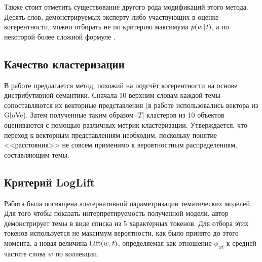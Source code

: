 Также стоит отметить существование другого рода модификаций этого метода. Десять слов, демонстрируемых эксперту либо участвующих в оценке когерентности, можно отбирать не по критерию максимума $p(w\mspace{2mu}{|}\mspace{2mu} t)$, а по некоторой более сложной формуле \cite{Blei_lafferty,ldavis2014,boydcare,frex}.





\subsection{Качество кластеризации}

В работе \cite{krasnov19clustering} предлагается метод, похожий на подсчёт когерентности на основе дистрибутивной семантики. Сначала 10 верхним словам каждой темы сопоставляются их векторные представления (в работе использовались вектора из GloVe). Затем полученные таким образом $|T|$ кластеров из 10 объектов оцениваются с помощью различных метрик кластеризации. Утверждается, что переход к векторным представлениям необходим, поскольку понятие <<расстояния>> не совсем применимо к вероятностным распределениям, составляющим темы.


\subsection{Критерий LogLift}
Работа \cite{taddy2012estimation} была посвящена альтернативной параметризации тематических моделей. Для того чтобы показать интерпретируемость полученной модели, автор демонстрирует темы в виде списка из 5 характерных токенов. Для отбора этих токенов используется не максимум вероятности, как было принято до этого момента, а новая величина $\textup{Lift}(w, t)$, определяемая как отношение $\phi_{wt}$ к средней частоте слова $w$ по коллекции.

